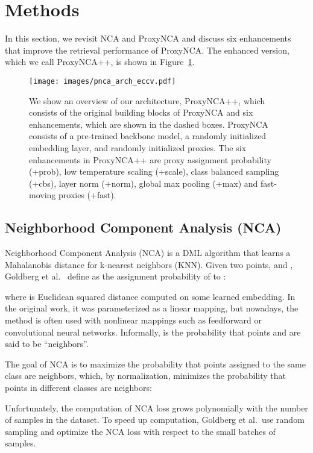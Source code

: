 \documentclass[runningheads]{llncs}
\begin{document}
\section{Methods}\label{sec:method}

In this section, we revisit NCA and ProxyNCA and discuss six enhancements that improve the retrieval performance of ProxyNCA. The enhanced version, which we call ProxyNCA++, is shown in Figure~\ref{fig:pnca_pp}.

\begin{figure}
  \centering
  \caption{
  We show an overview of our architecture, ProxyNCA++, which consists of the original building blocks of ProxyNCA and six enhancements, which are shown in the dashed boxes. ProxyNCA consists of a pre-trained backbone model, a randomly initialized embedding layer, and randomly initialized proxies. The six enhancements in ProxyNCA++ are proxy assignment probability (+prob), low temperature scaling (+scale), class balanced sampling (+cbs), layer norm (+norm), global max pooling (+max) and fast-moving proxies (+fast).
  }
  \bigskip
  \texttt{[image: images/pnca\_arch\_eccv.pdf]}

  \label{fig:pnca_pp}
\end{figure}

\subsection{Neighborhood Component Analysis (NCA)}
Neighborhood Component Analysis (NCA) is a DML algorithm that learns a Mahalanobis distance for k-nearest neighbors (KNN).  Given two points,  and , Goldberg et al.~\cite{goldberger2005neighbourhood} define  as the assignment probability of  to :
 

\noindent where  is Euclidean squared distance computed on some learned
embedding. In the original work, it was parameterized as a linear mapping, but
nowadays, the method is often used with nonlinear mappings such as feedforward or
convolutional neural networks. Informally,  is the probability that
points  and  are said to be ``neighbors''.

The goal of NCA is to maximize the probability that points assigned to the same
class are neighbors, which, by normalization, minimizes the probability that
points in different classes are neighbors:



Unfortunately, the computation of NCA loss grows polynomially with the number of samples in the dataset. To speed up computation, Goldberg et al.~use random sampling and optimize the NCA loss with respect to the small batches of samples.
\end{document}
